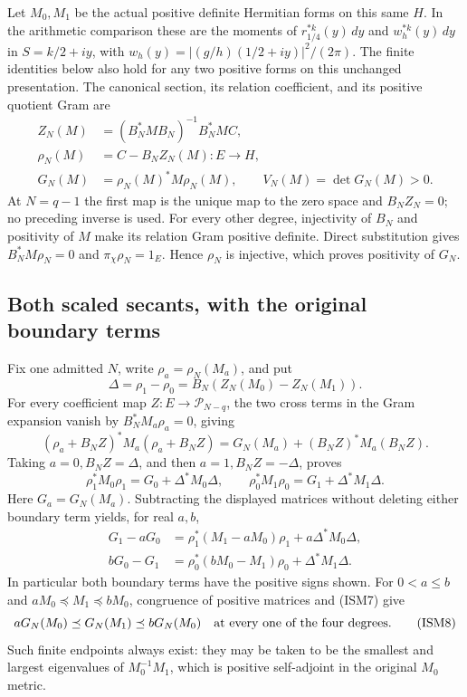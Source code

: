 Let \(M_0,M_1\) be the actual positive definite Hermitian forms
on this same \(H\).  In the arithmetic comparison these are the
moments of \(r_{1/4}^{*k}(y)\,dy\) and \(w_h^{*k}(y)\,dy\) in
\(S=k/2+iy\), with \(w_h(y)=|(g/h)(1/2+iy)|^2/(2\pi)\).
The finite identities below also hold for any two positive
forms on this unchanged presentation.  The canonical section,
its relation coefficient, and its positive quotient Gram are
\[
 \begin{split}
 Z_N(M)&=(B_N^*MB_N)^{-1}B_N^*MC,\\
 \rho_N(M)&=C-B_NZ_N(M):E\longrightarrow H,\\
 G_N(M)&=\rho_N(M)^*M\rho_N(M),\qquad
 V_N(M)=\det G_N(M)>0.
 \end{split}
 \tag{ISM3}
\]
At \(N=q-1\) the first map is the unique map to the zero
space and \(B_NZ_N=0\); no preceding inverse is used.
For every other degree, injectivity of \(B_N\) and positivity
of \(M\) make its relation Gram positive definite.  Direct
substitution gives \(B_N^*M\rho_N=0\) and
\(\pi_\chi\rho_N=1_E\).  Hence \(\rho_N\) is injective,
which proves positivity of \(G_N\).

\subsection{Both scaled secants, with the original boundary terms}

Fix one admitted \(N\), write \(\rho_a=\rho_N(M_a)\), and put
\[
 \Delta=\rho_1-\rho_0=B_N(Z_N(M_0)-Z_N(M_1)).
 \tag{ISM4}
\]
For every coefficient map \(Z:E\to\mathcal P_{N-q}\),
the two cross terms in the Gram expansion vanish by
\(B_N^*M_a\rho_a=0\), giving
\[
 (\rho_a+B_NZ)^*M_a(\rho_a+B_NZ)
   =G_N(M_a)+(B_NZ)^*M_a(B_NZ).
 \tag{ISM5}
\]
Taking \(a=0,B_NZ=\Delta\), and then \(a=1,B_NZ=-\Delta\),
proves
\[
 \rho_1^*M_0\rho_1=G_0+\Delta^*M_0\Delta,\qquad
 \rho_0^*M_1\rho_0=G_1+\Delta^*M_1\Delta.
 \tag{ISM6}
\]
Here \(G_a=G_N(M_a)\).  Subtracting the displayed matrices
without deleting either boundary term yields, for real \(a,b\),
\[
 \begin{split}
 G_1-aG_0
 &=\rho_1^*(M_1-aM_0)\rho_1+a\Delta^*M_0\Delta,\\
 bG_0-G_1
 &=\rho_0^*(bM_0-M_1)\rho_0+\Delta^*M_1\Delta.
 \end{split}
 \tag{ISM7}
\]
In particular both boundary terms have the positive signs
shown.  For \(0<a\leq b\) and
\(aM_0\preceq M_1\preceq bM_0\), congruence of positive
matrices and (ISM7) give
\[
 aG_N(M_0)\preceq G_N(M_1)\preceq bG_N(M_0)
 \quad\hbox{at every one of the four degrees.}
 \tag{ISM8}
\]
Such finite endpoints always exist: they may be taken to be
the smallest and largest eigenvalues of \(M_0^{-1}M_1\),
which is positive self-adjoint in the original \(M_0\) metric.

